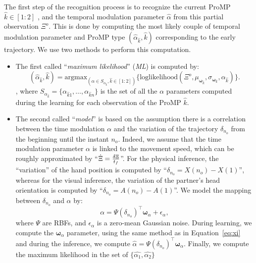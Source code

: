 \documentclass[runningheads,a4paper]{llncs}
\begin{document}
The first step of the recognition process is to recognize the current ProMP $\hat{k} \in [1:2]$ 
, and the temporal modulation parameter $\hat{\alpha}$ 
from this partial observation $\Xi^o$. This is done by computing the most likely couple of temporal modulation parameter and ProMP type  $(\hat{\alpha}_{\hat{k}},\hat{k})$ corresponding to the early trajectory. 
We use two methods to perform this computation. 
\begin{itemize}

\item The first called ``\textit{maximum likelihood}'' (\textit{ML}) is computed by:
\begin{equation}
\label{eq:ml}
(\hat{\alpha}_{\hat{k}},\hat{k}) = \mathrm{argmax}_{(\alpha \in S_{\alpha_{\hat{k}}}, \hat{k} \in [1:2])}\{\mathrm{loglikelihood}(\Xi^o,\mu_{\boldsymbol{\omega}_{\hat{k}}}, \sigma_{\boldsymbol{\omega}_{\hat{k}}}, \alpha_{\hat{k}})\} .
\end{equation}
, where $S_{\alpha_{\hat{k}}} = \{\alpha_{\hat{k}1},\ldots,\alpha_{\hat{k}n}\}$ is the set of all the $\alpha$ parameters computed during the learning for each observation of the ProMP $\hat{k}$.
\item The second called ``\textit{model}'' is based on the assumption there is a correlation between the time modulation $\alpha$ and the variation of the trajectory $\delta_{n_o}$ from the beginning until the instant $n_o$. Indeed, we assume that the time modulation parameter $\alpha$ is linked to the movement speed, which can be roughly approximated by ``$\dot{\Xi} ={ \delta \Xi  \over t_f}$''. For the physical inference, the ``variation'' of the hand position is computed by ``$\delta_{n_o} = X(n_o) - X(1)$'', whereas for the visual inference, the variation of the partner's head orientation is computed by ``$ \delta_{n_o} =A(n_o) - A(1)$''. We model the mapping between $\delta_{n_o}$ and $\alpha$ by: 
\begin{equation}
\label{eq:model}
\alpha = \Psi(\delta_{n_o})^\top \boldsymbol{\omega}_\alpha + \epsilon_\alpha,
\end{equation} 
where $\Psi$ are RBFs, and $\epsilon_\alpha$ is a zero-mean Gaussian noise.
During learning, we compute the  $\boldsymbol{\omega}_\alpha$ parameter, using the same method as in Equation~\ref{eq:xi} and during the inference, we compute $\hat{\alpha} = \Psi(\delta_{n_o})^\top \boldsymbol{\omega}_\alpha$. Finally, we compute the maximum likelihood in the set of $\{\hat{\alpha_1},\hat{\alpha_2} \}$
\end{itemize}
\end{document}
